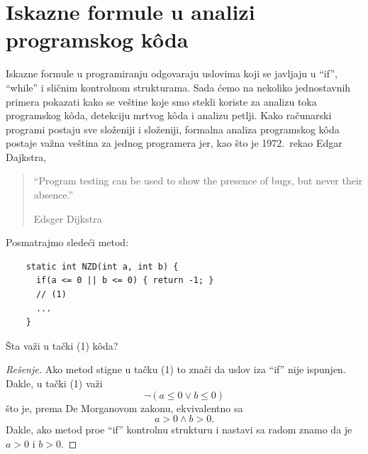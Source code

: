 % 
% 
% 
% 



\section{Iskazne formule u analizi programskog k\^oda}

Iskazne formule u programiranju odgovaraju uslovima koji se javljaju u \enquote{if}, \enquote{while} i sli\v cnim
kontrolnom strukturama. Sada \'cemo na nekoliko jednostavnih primera
pokazati kako se ve\v stine koje smo stekli koriste za analizu toka programskog k\^oda,
detekciju mrtvog k\^oda i analizu petlji. Kako ra\v cunarski programi postaju sve slo\v zeniji
i slo\v zeniji, formalna analiza programskog k\^oda postaje va\v zna ve\v stina za jednog programera
jer, kao \v sto je 1972.\ rekao Edgar Dajkstra,
\begin{quote}
  \enquote{Program testing can be used to show the presence of bugs, but never their absence.}
  
  Edsger Dijkstra
\end{quote}

\begin{EX}
  Posmatrajmo slede\'ci metod:
{\small
\begin{verbatim}
    static int NZD(int a, int b) {
      if(a <= 0 || b <= 0) { return -1; }
      // (1)
      ...
    }
\end{verbatim}
}
\noindent
\v Sta va\v zi u ta\v cki (1) k\^oda?
\end{EX}
\begin{proof}[Re\v senje]
  Ako metod stigne u ta\v cku (1) to zna\v ci da uslov iza \enquote{if} nije ispunjen. Dakle, u ta\v cki (1)
  va\v zi
  $$
    \lnot(a \le 0 \lor b \le 0)
  $$
  \v sto je, prema De Morganovom zakonu, ekvivalentno sa
  $$
    a > 0 \land b > 0.
  $$
  Dakle, ako metod pro\dj e \enquote{if} kontrolnu strukturu i nastavi sa radom znamo da je $a > 0$ i $b > 0$.
\end{proof}

